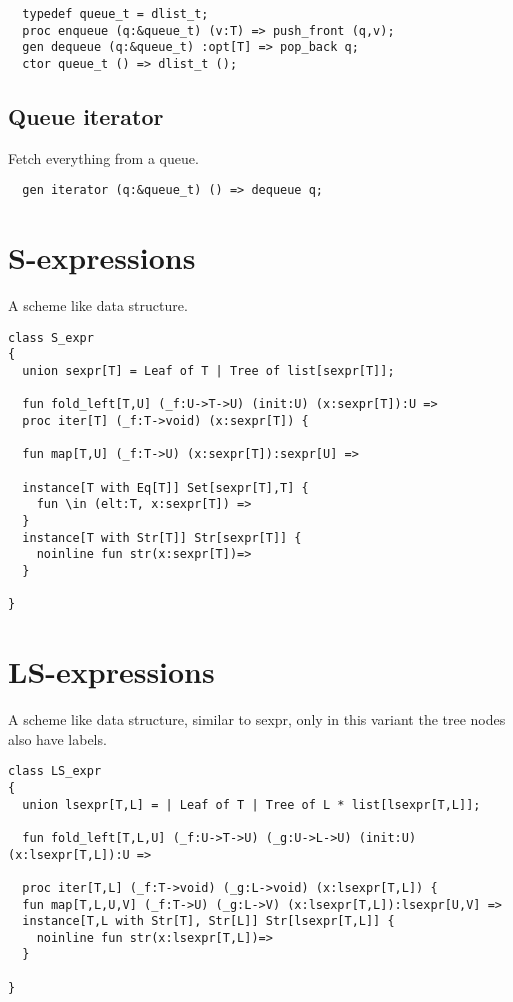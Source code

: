 \documentclass[oneside]{book}
\begin{document}
\begin{verbatim}
  typedef queue_t = dlist_t;
  proc enqueue (q:&queue_t) (v:T) => push_front (q,v);
  gen dequeue (q:&queue_t) :opt[T] => pop_back q;
  ctor queue_t () => dlist_t ();
\end{verbatim}

\subsection{Queue iterator}
Fetch everything from a queue.

\begin{verbatim}
  gen iterator (q:&queue_t) () => dequeue q;
\end{verbatim}


\section{S-expressions}
A scheme like data structure.

\begin{verbatim}
class S_expr 
{
  union sexpr[T] = Leaf of T | Tree of list[sexpr[T]]; 

  fun fold_left[T,U] (_f:U->T->U) (init:U) (x:sexpr[T]):U =>
  proc iter[T] (_f:T->void) (x:sexpr[T]) {

  fun map[T,U] (_f:T->U) (x:sexpr[T]):sexpr[U] =>

  instance[T with Eq[T]] Set[sexpr[T],T] {
    fun \in (elt:T, x:sexpr[T]) => 
  }
  instance[T with Str[T]] Str[sexpr[T]] {
    noinline fun str(x:sexpr[T])=>
  }

}

\end{verbatim}

\section{LS-expressions}
A scheme like data structure, similar to sexpr, only in this variant
the tree nodes also have labels.

\begin{verbatim}
class LS_expr 
{
  union lsexpr[T,L] = | Leaf of T | Tree of L * list[lsexpr[T,L]]; 

  fun fold_left[T,L,U] (_f:U->T->U) (_g:U->L->U) (init:U) (x:lsexpr[T,L]):U =>

  proc iter[T,L] (_f:T->void) (_g:L->void) (x:lsexpr[T,L]) {
  fun map[T,L,U,V] (_f:T->U) (_g:L->V) (x:lsexpr[T,L]):lsexpr[U,V] =>
  instance[T,L with Str[T], Str[L]] Str[lsexpr[T,L]] {
    noinline fun str(x:lsexpr[T,L])=>
  }

}

\end{verbatim}
\end{document}
